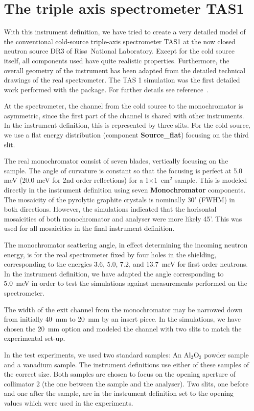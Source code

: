 \section{The triple axis spectrometer TAS1}
\label{s:TAS1}
With this instrument definition, we have tried to create
a very detailed model of the conventional cold-source
triple-axis spectrometer TAS1 at the now closed neutron source DR3 of
Ris\o\ National Laboratory.
Except for the cold source itself, all components
used have quite realistic properties. Furthermore, the overall
geometry of the instrument has been adapted from
the detailed technical drawings of the real spectrometer.
The TAS 1 simulation was the first detailed work
performed with the \MCS package.
For further details see reference~\cite{tas1_report}.

At the spectrometer, the channel from the cold source
to the monochromator is asymmetric, since the first
part of the channel is shared with other instruments.
In the instrument definition, this is represented by
three slits.
For the cold source, we use a flat energy
distribution (component {\bf Source\_flat})
focusing on the third slit.

The real monochromator consist of seven blades, vertically focusing on
the sample. The angle of curvature is constant so that the focusing is
perfect at 5.0 meV (20.0 meV for 2nd order reflections) for a 1$\times$1~cm$^2$
sample. This is modeled directly in the instrument definition using
seven {\bf Monochromator} components. The mosaicity of the pyrolytic
graphite crystals is nominally 30' (FWHM) in both directions.  However, the
simulations indicated that the horisontal mosaicities of both
monochromator and analyser were more likely 45'. This was used for all
mosaicities in the final instrument definition.

The monochromator scattering angle, in effect determining the incoming
neutron energy, is for the real spectrometer fixed by four holes in the
shielding, corresponding to the energies 3.6, 5.0, 7.2, and 13.7~meV for
first order neutrons.  In the instrument definition, we have adapted the
angle corresponding to 5.0~meV in order to test the simulations against
measurements performed on the spectrometer.

The width of the exit channel from the monochromator may
be narrowed down from initially 40~mm
to 20~mm by an insert piece. In the simulations, we have chosen
the 20~mm option and modeled the channel with two slits to match
the experimental set-up.

In the test experiments, we used two standard samples:
An Al$_2$O$_3$ powder sample and a vanadium sample. The instrument
definitions use either of these samples of the correct
size. Both samples are chosen to focus on the opening aperture of
collimator 2 (the one between the sample and the analyser).
Two slits, one before and one after the sample,
are in the instrument definition set to the opening values which
were used in the experiments.

